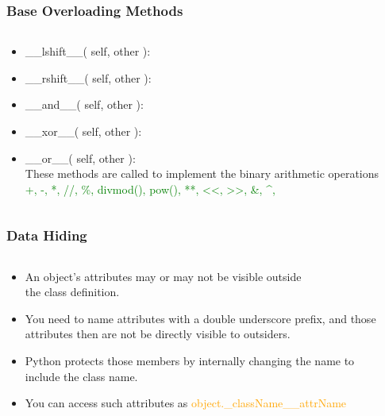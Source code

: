 \documentclass{beamer}
\begin{document}
\begin{frame}
	\frametitle{Base Overloading Methods}
	\begin{columns}[c]
		\begin{column}{30cm}
			\vspace{.1cm}
			\begin{itemize}
				\justifying
				\item \_\_lshift\_\_( self, other ):
				\item \_\_rshift\_\_( self, other ):
				\item \_\_and\_\_( self, other ):
				\item \_\_xor\_\_( self, other ):
				\item \_\_or\_\_( self, other ): \\
				\textcolor{Ocean}{These methods are called to implement the binary arithmetic operations} \\
				\textcolor{green}{+, -, *, //, \%, divmod(), pow(), **, \textless\textless, \textgreater\textgreater,
				\&, \textasciicircum, \textbar}
			\end{itemize}
		\end{column}
	\end{columns}
\end{frame}

\begin{frame}
	\frametitle{Data Hiding}
	\begin{columns}[c]
		\begin{column}{30cm}
			\vspace{.1cm}
			\begin{itemize}
				\justifying
				\item An object's attributes may or may not be visible outside \\
				the class definition.
				\item You need to name attributes with a double underscore prefix, and those \\
				attributes then are not be directly visible to outsiders.
				\item Python protects those members by internally changing the name to \\
				include the class name.
				\item You can access such attributes as \textcolor{orange}{object.\_className\_\_attrName}
			\end{itemize}
		\end{column}
	\end{columns}
	\vspace{1cm}
	\hspace*{5.5cm}
\end{frame}
\end{document}
